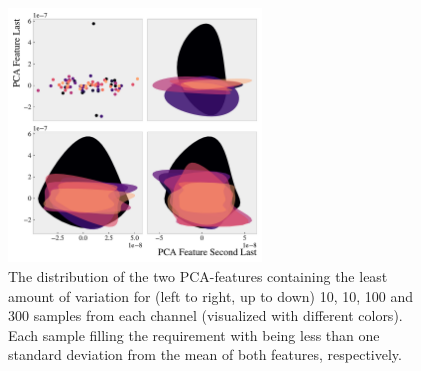 \begin{figure}
    \centering
    \includegraphics[width=0.6\textwidth]{Figures/MLResults/DataHandling/PCA/PCAPlotLast.pdf}
    \caption[The value distribution of the two last \acs{PCA}-features.]{The distribution of the two 
    \ac{PCA}-features containing the least amount of variation for (left to right, up to down) 10, 
    10, 100 and 300 samples from each channel (visualized with different colors). Each sample filling the 
    requirement with being less than one standard deviation from the mean of both features, respectively.}
    \label{fig:PCA2}
\end{figure}


